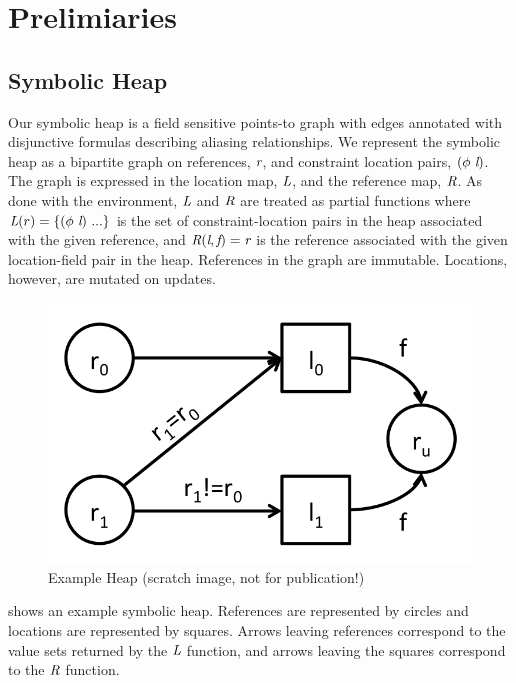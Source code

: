 \section{Prelimiaries}
\label{sec:sh}

\subsection{Symbolic Heap}

Our symbolic heap is a field sensitive points-to graph with edges
annotated with disjunctive formulas describing aliasing
relationships. We represent the symbolic heap as a bipartite graph on
references, $\emph{r}$, and constraint location pairs,
$(\phi\ \emph{l})$. The graph is expressed in the location map,
$\emph{L}$, and the reference map, $\emph{R}$. As done with the
environment, $\emph{L}$ and $\emph{R}$ are treated as partial
functions where $\cfgnt{L}(r) = \{(\phi\ \cfgnt{l})\ ...\}$ is the set
of constraint-location pairs in the heap associated with the given
reference, and $\emph{R}(\emph{l},\emph{f}) = \emph{r}$ is the
reference associated with the given location-field pair in the
heap. References in the graph are immutable. Locations, however, are
mutated on updates.

\begin{figure}[t]
\begin{center}
\includegraphics[scale=0.2]{../figs/simple_heap_scratch.png}
\end{center}
\caption{Example Heap (scratch image, not for publication!)}
\label{fig:exampleHeap}
\end{figure}

 shows an example symbolic heap. References are 
represented by circles and locations are represented by squares. Arrows leaving
references correspond to the value sets returned by the $\emph{L}$ function, and 
arrows leaving the squares correspond to the $\emph{R}$ function.

